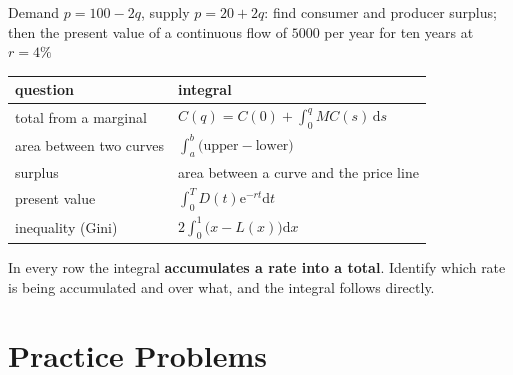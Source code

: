 \begin{worked}{Demand $p=100-2q$, supply $p=20+2q$: find consumer and producer surplus; then the present value of a continuous flow of $5000$ per year for ten years at $r=4\%$}
\begin{center}\footnotesize
\begin{tabular}{ll}
  \hline
  question & integral\\
  \hline
  total from a marginal & $C(q)=C(0)+\int_{0}^{q}MC(s)\,\mathrm{d}s$\\
  area between two curves & $\int_{a}^{b}\bigl(\text{upper}-\text{lower}\bigr)$\\
  surplus & area between a curve and the price line\\
  present value & $\int_{0}^{T}D(t)\mathrm{e}^{-rt}\mathrm{d}t$\\
  inequality (Gini) & $2\int_{0}^{1}\bigl(x-L(x)\bigr)\mathrm{d}x$\\
  \hline
\end{tabular}
\end{center}
In every row the integral \textbf{accumulates a rate into a total}. Identify
which rate is being accumulated and over what, and the integral follows
directly.
\end{worked}

\section{Practice Problems}

